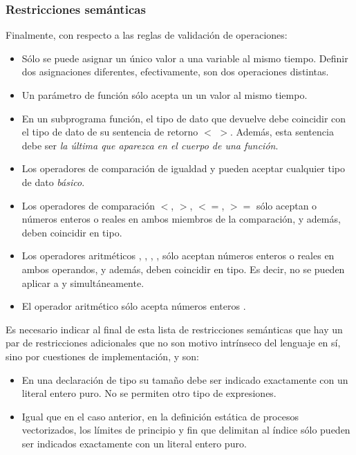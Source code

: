 \subsubsection{Restricciones semánticas}\label{subsubsec:restriccionesSemanticas}
Finalmente, con respecto a las reglas de validación de operaciones:
\begin{itemize}
    \item Sólo se puede asignar un único valor a una variable al mismo tiempo. Definir dos asignaciones diferentes, efectivamente, son dos operaciones distintas.
    \item Un parámetro de función sólo acepta un un valor al mismo tiempo.
    \item En un subprograma función, el tipo de dato que devuelve debe coincidir con el tipo de dato de su sentencia de retorno $<$  $>$. Además, esta sentencia  debe ser \textit{la última que aparezca en el cuerpo de una función}.
    \item Los operadores de comparación de igualdad \code{\!=} y \code{==} pueden aceptar cualquier tipo de dato \textit{básico}.
    \item Los operadores de comparación $<$, $>$, $<=$, $>=$ sólo aceptan o números enteros  o reales  en ambos miembros de la comparación, y además, deben coincidir en tipo.
    \item Los operadores aritméticos \code{+}, \code{-}, \code{*}, \code{/}, sólo aceptan números enteros  o reales  en ambos operandos, y además, deben coincidir en tipo. Es decir, no se pueden aplicar a  y  simultáneamente.
    \item El operador aritmético \code{\%} sólo acepta números enteros .
\end{itemize}



Es necesario indicar al final de esta lista de restricciones semánticas que hay un par de restricciones adicionales que no son motivo intrínseco del lenguaje en sí, sino por cuestiones de implementación, y son:

\begin{itemize}
    \item En una declaración de tipo  su tamaño debe ser indicado exactamente con un literal entero puro. No se permiten otro tipo de expresiones.
    \item Igual que en el caso anterior, en la definición estática de procesos vectorizados, los límites de principio y fin que delimitan al índice sólo pueden ser indicados exactamente con un literal entero puro.
\end{itemize}


